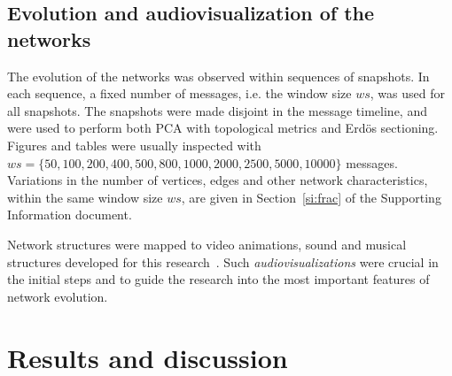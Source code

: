 \documentclass[%
aip,
jmp,%
amsmath,amssymb,
reprint,%
]{revtex4-1}
\begin{document}
\subsection{Evolution and audiovisualization of the networks}\label{sec:viz}
The evolution of the networks was observed within 
sequences of snapshots. In each sequence, a fixed number of messages,
i.e. the window size $ws$, was used for all snapshots.
The snapshots were made disjoint in the message timeline, and were used to perform both PCA with topological metrics and Erd\"os sectioning.  
Figures and tables were usually inspected with 
$ws=\{50, 100, 200, 400, 500, 800, 1000, 2000, 2500, 5000, 10000\}$ messages. Variations in the number of vertices, edges
and other network characteristics, within the same window size $ws$,
are given in Section~\ref*{si:frac} of the Supporting Information document. 

Network structures were mapped to video animations, sound and musical structures developed for this research~\cite{animacoes}.%
Such \emph{audiovisualizations} were crucial in the initial steps and
to guide the research into the most important features of network evolution.

\section{Results and discussion}\label{sec:results}
\end{document}
